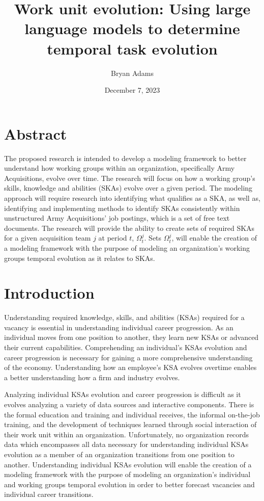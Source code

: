 \documentclass[12pt]{article}
\title{\sc Work unit evolution: Using large language models to determine temporal task evolution}
\author{Bryan Adams}
\date{December 7, 2023}
\begin{document}
\maketitle

\section*{Abstract}

The proposed research is intended to develop a modeling framework to better understand how working groups within an organization, specifically Army Acquisitions, evolve over time. The research will focus on how a working group's skills, knowledge and abilities (SKAs) evolve over a given period. The modeling approach will require research into identifying what qualifies as a SKA, as well as, identifying and implementing methods to identify SKAs consistently within unstructured Army Acquisitions’ job postings, which is a set of free text documents. The research will provide the ability to create sets of required SKAs for a given acquisition team $j$ at period $t$, $\Omega_t^j$. Sets $\Omega_t^j$, will enable the creation of a modeling framework with the purpose of modeling an organization's working groups temporal evolution as it relates to SKAs.

\section{Introduction}

Understanding required knowledge, skills, and abilities (KSAs) required for a vacancy is essential in understanding individual career progression. As an individual moves from one position to another, they learn new KSAs or advanced their current capabilities. Comprehending an individual's KSAs evolution and career progression is necessary for gaining a more comprehensive understanding of the economy. Understanding how an employee's KSA evolves overtime enables a better understanding how a firm and industry evolves. 

Analyzing individual KSAs evolution and career progression is difficult as it evolves analyzing a variety of data sources and interactive components. There is the formal education and training and individual receives, the informal on-the-job training, and the development of techniques learned through social interaction of their work unit within an organization. Unfortunately, no organization records data which encompasses all data necessary for understanding individual KSAs evolution as a member of an organization transitions from one position to another. Understanding individual KSAs evolution will enable the creation of a modeling framework with the purpose of modeling an organization's individual and working groups temporal evolution in order to better forecast vacancies and individual career transitions. 
\end{document}
